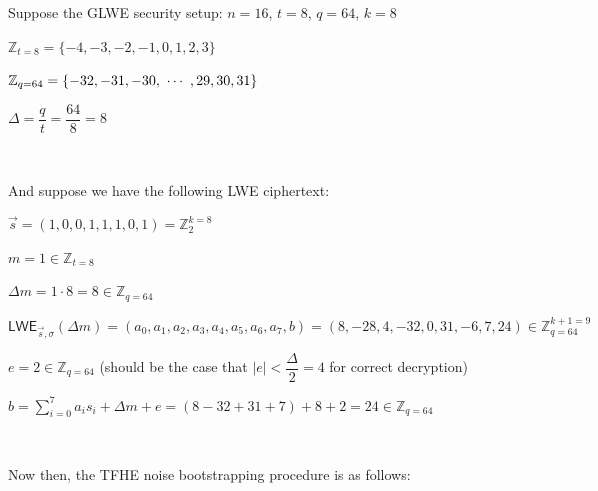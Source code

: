 Suppose the GLWE security setup: $n = 16$, $t = 8$, $q = 64$, $k = 8$

$\mathbb{Z}_{t=8} = \{-4, -3, -2, -1, 0 , 1, 2, 3\}$

$\mathbb{Z}_{q=64} = \{ -32, -31, -30, \text{ } \text{$\cdots$} \text{ }, 29, 30, 31 \}$

$\Delta = \dfrac{q}{t} = \dfrac{64}{8} = 8$

$ $

And suppose we have the following LWE ciphertext:

$\vec{s} = (1, 0, 0, 1, 1, 1, 0, 1) = \mathbb{Z}_2^{k=8}$

$m = 1  \in \mathbb{Z}_{t=8}$

$\Delta m = 1 \cdot 8 = 8 \in \mathbb{Z}_{q=64}$



$\textsf{LWE}_{\vec{s}, \sigma}(\Delta m) = (a_0, a_1, a_2, a_3, a_4, a_5, a_6, a_7, b) 
= (8, -28, 4, -32, 0, 31, -6, 7, 24) \in \mathbb{Z}_{q=64}^{k+1=9}$

$e = 2 \in \mathbb{Z}_{q=64}$ (should be the case that $|e| < \dfrac{\Delta}{2} = 4$ for correct decryption)

$b = \sum\limits_{i=0}^{7}a_is_i + \Delta m + e = (8 -32 + 31 +7) + 8 + 2 = 24 \in \mathbb{Z}_{q=64}$

$ $

Now then, the TFHE noise bootstrapping procedure is as follows:

$ $

